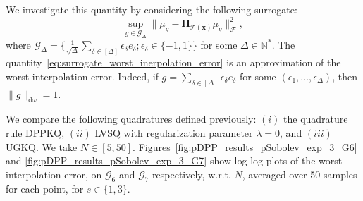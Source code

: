\documentclass[twoside,11pt]{book}
\numberwithin{theorem}{chapter}
\numberwithin{definition}{chapter}
\numberwithin{proposition}{chapter}
\numberwithin{corollary}{chapter}
\numberwithin{example}{chapter}
\numberwithin{lemma}{chapter}
\begin{document}
We investigate this quantity by considering the following surrogate:
\begin{equation}\label{eq:surrogate_worst_inerpolation_error}
\sup\limits_{g \in \mathcal{G}_{\Delta} } \|\mu_{g}-\bm{\Pi}_{\mathcal{T}(\bm{x})} \mu_{g}\|_{\mathcal{F}}^{2},
\end{equation}
where $\mathcal{G}_{\Delta} = \{ \frac{1}{\sqrt{\Delta}} \sum\limits_{\delta \in [\Delta]} \epsilon_{\delta} e_{\delta}; \epsilon_{\delta} \in \{-1,1\}\}$ for some $\Delta \in \mathbb{N}^{*}$. The quantity~\eqref{eq:surrogate_worst_inerpolation_error} is an approximation of the worst interpolation error. Indeed, if $g = \sum\limits_{\delta \in [\Delta]} \epsilon_{\delta} e_{\delta}$ for some $(\epsilon_{1}, \dots, \epsilon_{\Delta})$, then $\|g\|_{\mathrm{d}\omega} = 1$.

We compare the following quadratures defined previously: $(i)$ the quadrature rule DPPKQ, $(ii)$ LVSQ with regularization parameter $\lambda = 0$, and $(iii)$ UGKQ. We take $N \in [5,50]$. Figures~\ref{fig:pDPP_results_pSobolev_exp_3_G6} and \ref{fig:pDPP_results_pSobolev_exp_3_G7} show log-log plots of the worst interpolation error, on $\mathcal{G}_{6}$ and $\mathcal{G}_{7}$ respectively, w.r.t. $N$, averaged over 50 samples for each point, for $s \in \{1,3\}$. 
\end{document}
